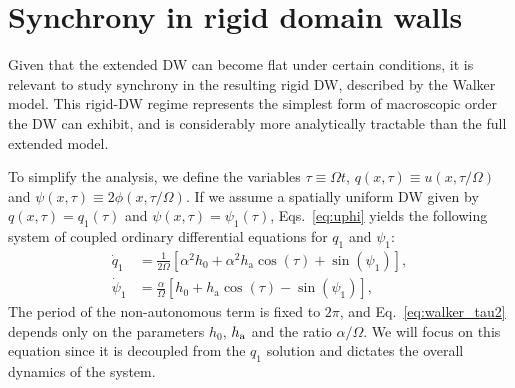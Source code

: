 \documentclass[prb,aps,twocolumn,superscriptaddress,floatfix]{revtex4-1}
\begin{document}
\section{Synchrony in rigid domain walls}
\label{sec:flat_sync}

Given that the extended DW can become flat under certain conditions, it is relevant to study synchrony in the resulting rigid DW, described by the Walker model. This rigid-DW regime represents the simplest form of macroscopic order the DW can exhibit, and is considerably more analytically tractable than the full extended model.

To simplify the analysis, we define the variables $\tau\equiv\Omega t$, $q(x,\tau)\equiv  u(x,\tau/\Omega)$ and $\psi(x,\tau)\equiv2\phi(x,\tau/\Omega)$. If we assume a spatially uniform DW given by $q(x,\tau)=q_1(\tau)$ and $\psi(x,\tau)=\psi_1(\tau)$, Eqs.~\eqref{eq:uphi} yields the following system of coupled ordinary differential equations for $q_1$ and $\psi_1$:
%
\begin{align}
    \dot{q}_1 &= \frac 1 {2\Omega} \left[ \alpha ^2h_0+\alpha^2h_\text{a}\cos(\tau) + \sin (\psi_1)\right], 
    \label{eq:walker_tau1}
    \\
    \dot \psi_1 &= \frac \alpha \Omega \left[ h_0 +  h_\text{a}\cos(\tau) - \sin(\psi_1) \right],
    \label{eq:walker_tau2}
\end{align}
%
The period of the non-autonomous term is fixed to $2\pi$, and Eq.~\eqref{eq:walker_tau2} depends only on the parameters $h_0$, $h_\text a$ and the ratio $\alpha/\Omega$. We will focus on this equation since it is decoupled from the $q_1$ solution and dictates the overall dynamics of the system.
\end{document}
